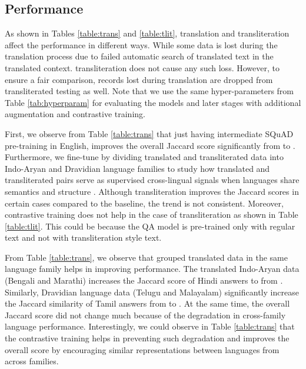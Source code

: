 \documentclass[11pt]{article}
\begin{document}
\subsection{Performance}

As shown in Tables \ref{table:trans} and \ref{table:tlit}, translation and transliteration affect the performance in different ways. While some data is lost during the translation process due to failed automatic search of translated text in the translated context. transliteration does not cause any such loss. However, to ensure a fair comparison, records lost during translation are dropped from transliterated testing as well. Note that we use the same hyper-parameters from Table \ref{tab:hyperparam} for evaluating the models and later stages with additional augmentation and contrastive training.

First, we observe from Table \ref{table:trans} that just having intermediate SQuAD pre-training in English, improves the overall Jaccard score significantly from  to . Furthermore, we fine-tune by dividing translated and transliterated data into Indo-Aryan and Dravidian language families to study how translated and transliterated pairs serve as supervised cross-lingual signals when languages share semantics and structure \cite{mikolov2013exploiting}. Although transliteration improves the Jaccard scores in certain cases compared to the baseline, the trend is not consistent. Moreover, contrastive training does not help in the case of transliteration as shown in Table \ref{table:tlit}. This could be because the QA model is pre-trained only with regular text and not with transliteration style text.

From Table \ref{table:trans}, we observe that grouped translated data in the same language family helps in improving performance. The translated Indo-Aryan data (Bengali and Marathi) increases the Jaccard score of Hindi answers to  from . Similarly, Dravidian language data (Telugu and Malayalam) significantly increase the Jaccard similarity of Tamil answers from  to . At the same time, the overall Jaccard score did not change much because of the degradation in cross-family language performance. Interestingly, we could observe in Table \ref{table:trans} that the contrastive training helps in preventing such degradation and improves the overall score by encouraging similar representations between languages from across families.
\end{document}
